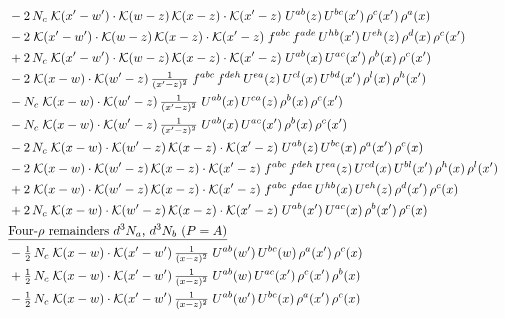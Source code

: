 \documentclass[10pt]{article}
\numberwithin{equation}{section}
\begin{document}
\begin{align}
&\quad -2\,N_c\;\mathcal{K}(x'-w')\cdot\mathcal{K}(w-z)\,\mathcal{K}(x-z)\cdot\mathcal{K}(x'-z)\;U^{ab}(z)\,U^{bc}(x')\,\rho^{c}(x')\,\rho^{a}(x)\notag\\
&\quad -2\;\mathcal{K}(x'-w')\cdot\mathcal{K}(w-z)\,\mathcal{K}(x-z)\cdot\mathcal{K}(x'-z)\;f^{abc}\,f^{ade}\,U^{hb}(x')\,U^{eh}(z)\,\rho^{d}(x)\,\rho^{c}(x')\notag\\
&\quad +2\,N_c\;\mathcal{K}(x'-w')\cdot\mathcal{K}(w-z)\,\mathcal{K}(x-z)\cdot\mathcal{K}(x'-z)\;U^{ab}(x)\,U^{ac}(x')\,\rho^{b}(x)\,\rho^{c}(x')\notag\\
&\quad -2\;\mathcal{K}(x-w)\cdot\mathcal{K}(w'-z)\,\tfrac{1}{(x'-z)^{2}}\;f^{abc}\,f^{deh}\,U^{ea}(z)\,U^{cl}(x)\,U^{bd}(x')\,\rho^{l}(x)\,\rho^{h}(x')\notag\\
&\quad -N_c\;\mathcal{K}(x-w)\cdot\mathcal{K}(w'-z)\,\tfrac{1}{(x'-z)^{2}}\;U^{ab}(x)\,U^{ca}(z)\,\rho^{b}(x)\,\rho^{c}(x')\notag\\
&\quad -N_c\;\mathcal{K}(x-w)\cdot\mathcal{K}(w'-z)\,\tfrac{1}{(x'-z)^{2}}\;U^{ab}(x)\,U^{ac}(x')\,\rho^{b}(x)\,\rho^{c}(x')\notag\\
&\quad -2\,N_c\;\mathcal{K}(x-w)\cdot\mathcal{K}(w'-z)\,\mathcal{K}(x-z)\cdot\mathcal{K}(x'-z)\;U^{ab}(z)\,U^{bc}(x)\,\rho^{a}(x')\,\rho^{c}(x)\notag\\
&\quad -2\;\mathcal{K}(x-w)\cdot\mathcal{K}(w'-z)\,\mathcal{K}(x-z)\cdot\mathcal{K}(x'-z)\;f^{abc}\,f^{deh}\,U^{ea}(z)\,U^{cd}(x)\,U^{bl}(x')\,\rho^{h}(x)\,\rho^{l}(x')\notag\\
&\quad +2\;\mathcal{K}(x-w)\cdot\mathcal{K}(w'-z)\,\mathcal{K}(x-z)\cdot\mathcal{K}(x'-z)\;f^{abc}\,f^{dae}\,U^{hb}(x)\,U^{eh}(z)\,\rho^{d}(x')\,\rho^{c}(x)\notag\\
&\quad +2\,N_c\;\mathcal{K}(x-w)\cdot\mathcal{K}(w'-z)\,\mathcal{K}(x-z)\cdot\mathcal{K}(x'-z)\;U^{ab}(x')\,U^{ac}(x)\,\rho^{b}(x')\,\rho^{c}(x)\notag\\
&\quad\underline{\text{Four-$\rho$ remainders $d^3N_a$, $d^3N_b$ ($P=A$)}}\notag\\
&\quad -\tfrac{1}{2}\,N_c\;\mathcal{K}(x-w)\cdot\mathcal{K}(x'-w')\,\tfrac{1}{(x-z)^{2}}\;U^{ab}(w')\,U^{bc}(w)\,\rho^{a}(x')\,\rho^{c}(x)\notag\\
&\quad +\tfrac{1}{2}\,N_c\;\mathcal{K}(x-w)\cdot\mathcal{K}(x'-w')\,\tfrac{1}{(x-z)^{2}}\;U^{ab}(w)\,U^{ac}(x')\,\rho^{c}(x')\,\rho^{b}(x)\notag\\
&\quad -\tfrac{1}{2}\,N_c\;\mathcal{K}(x-w)\cdot\mathcal{K}(x'-w')\,\tfrac{1}{(x-z)^{2}}\;U^{ab}(w')\,U^{bc}(x)\,\rho^{a}(x')\,\rho^{c}(x)\notag\\

\end{align}
\end{document}
